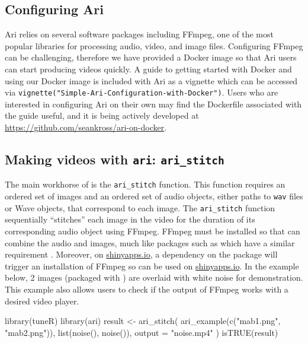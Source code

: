 \hypertarget{configuring-ari}{%
\subsection{Configuring Ari}\label{configuring-ari}}

Ari relies on several software packages including FFmpeg, one of the
most popular libraries for processing audio, video, and image files.
Configuring FFmpeg can be challenging, therefore we have provided a
Docker image so that Ari users can start producing videos quickly. A
guide to getting started with Docker and using our Docker image is
included with Ari as a vignette which can be accessed via
\texttt{vignette("Simple-Ari-Configuration-with-Docker")}. Users who are
interested in configuring Ari on their own may find the Dockerfile
associated with the guide useful, and it is being actively developed at
\url{https://github.com/seankross/ari-on-docker}.

\hypertarget{making-videos-with-ari-ari_stitch}{%
\subsection{\texorpdfstring{Making videos with \texttt{ari}:
\texttt{ari\_stitch}}{Making videos with ari: ari\_stitch}}\label{making-videos-with-ari-ari_stitch}}

The main workhorse of  is the \texttt{ari\_stitch} function.
This function requires an ordered set of images and an ordered set of
audio objects, either paths to \texttt{wav} files or  Wave
objects, that correspond to each image. The \texttt{ari\_stitch}
function sequentially ``stitches'' each image in the video for the
duration of its corresponding audio object using FFmpeg. FFmpeg must be
installed so that  can combine the audio and images, much like
packages such as  which have a similar requirement
\citep{aniart, anipkg}. Moreover, on
\href{https://www.shinyapps.io/}{shinyapps.io}, a dependency on the
 package will trigger an installation of FFmpeg so
 can be used on \href{https://www.shinyapps.io/}{shinyapps.io}.
In the example below, 2 images (packaged with ) are overlaid
with white noise for demonstration. This example also allows users to
check if the output of FFmpeg works with a desired video player.

\begin{Schunk}
\begin{Sinput}
library(tuneR)
library(ari)
result <- ari_stitch(
  ari_example(c("mab1.png", "mab2.png")),
  list(noise(), noise()),
  output = "noise.mp4"
)
isTRUE(result)
\end{Sinput}
\end{Schunk}

